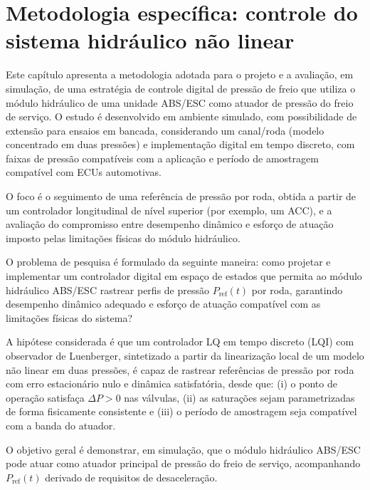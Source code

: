 \chapter{Metodologia específica: controle do sistema hidráulico não linear}
\label{cap:controle}

Este capítulo apresenta a metodologia adotada para o projeto e a avaliação, em simulação, de uma estratégia de controle digital de pressão de freio que utiliza o módulo hidráulico de uma unidade ABS/ESC como atuador de pressão do freio de serviço. O estudo é desenvolvido em ambiente simulado, com possibilidade de extensão para ensaios em bancada, considerando um canal/roda (modelo concentrado em duas pressões) e implementação digital em tempo discreto, com faixas de pressão compatíveis com a aplicação e período de amostragem compatível com ECUs automotivas.

O foco é o seguimento de uma referência de pressão por roda, obtida a partir de um controlador longitudinal de nível superior (por exemplo, um ACC), e a avaliação do compromisso entre desempenho dinâmico e esforço de atuação imposto pelas limitações físicas do módulo hidráulico.

O problema de pesquisa é formulado da seguinte maneira: como projetar e implementar um controlador digital em espaço de estados que permita ao módulo hidráulico ABS/ESC rastrear perfis de pressão $P_{\mathrm{ref}}(t)$ por roda, garantindo desempenho dinâmico adequado e esforço de atuação compatível com as limitações físicas do sistema?

A hipótese considerada é que um controlador LQ em tempo discreto (LQI) com observador de Luenberger, sintetizado a partir da linearização local de um modelo não linear em duas pressões, é capaz de rastrear referências de pressão por roda com erro estacionário nulo e dinâmica satisfatória, desde que: (i) o ponto de operação satisfaça $\Delta P>0$ nas válvulas, (ii) as saturações sejam parametrizadas de forma fisicamente consistente e (iii) o período de amostragem seja compatível com a banda do atuador.

O objetivo geral é demonstrar, em simulação, que o módulo hidráulico ABS/ESC pode atuar como atuador principal de pressão do freio de serviço, acompanhando $P_{\mathrm{ref}}(t)$ derivado de requisitos de desaceleração.

